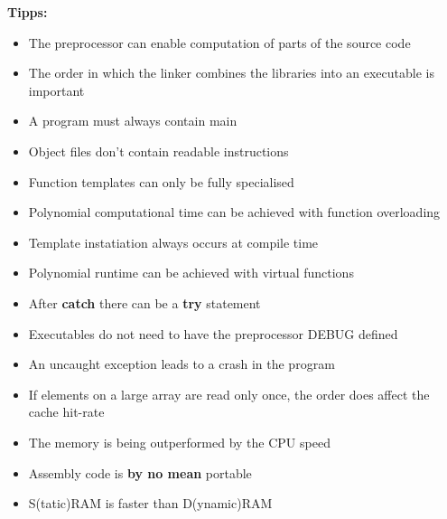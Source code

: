 \documentclass[fontsize=8pt, a4paper, landscape, fleqn]{scrartcl}
\begin{document}
\begin{multicols*}{2}[\raggedcolumns]
    \textbf{Tipps:}
    \begin{itemize}
        \item The preprocessor can enable computation of parts of the source code
        \item The order in which the linker combines the libraries into an executable is important
        \item A program must always contain main
        \item Object files don't contain readable instructions
        \item Function templates can only be fully specialised
        \item Polynomial computational time can be achieved with function overloading
        \item Template instatiation always occurs at compile time
        \item Polynomial runtime can be achieved with virtual functions
        \item After \textbf{catch} there can be a \textbf{try} statement
        \item Executables do not need to have the preprocessor DEBUG defined
        \item An uncaught exception leads to a crash in the program
        \item If elements on a large array are read only once, the order does affect the cache hit-rate
        \item The memory is being outperformed by the CPU speed
        \item Assembly code is \textbf{by no mean} portable
        \item S(tatic)RAM is faster than D(ynamic)RAM
    \end{itemize}
\end{multicols*}
\end{document}
